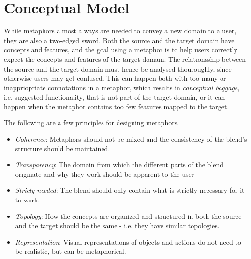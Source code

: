 \section{Conceptual Model} \label{sec:conceptual_model}






While metaphors almost always are needed to convey a new domain to a user, they are also a two-edged sword. Both the source and the target domain have concepts and features, and the goal using a metaphor is to help users correctly expect the concepts and features of the target domain. The relationsship between the source and the target domain must hence be analysed thouroughly, since otherwise users may get confused. This can happen both with too many or inappriopriate connotations in a metaphor, which results in \emph{conceptual baggage}, i.e. suggested functionality, that is not part of the target domain, or it can happen when the metaphor contains too few features mapped to the target. \cite[p. 192, 195-196]{benyon14} \cite[p. 181-182]{anderson} 



The following are a few principles for designing metaphors. \cite[p. 196]{benyon14}
\begin{itemize}
  \item \emph{Coherence}:
    Metaphors should not be mixed and the consistency of the blend's structure should be maintained.
  \item \emph{Transparency}:
    The domain from which the different parts of the blend originate and why they work should be apparent to the user
  \item \emph{Stricly needed}:
    The blend should only contain what is strictly necessary for it to work.
  \item \emph{Topology}:
    How the concepts are organized and structured in both the source and the target should be the same - i.e. they have similar topologies.
  \item \emph{Representation}:
    Visual representations of objects and actions do not need to be realistic, but can be metaphorical.    
\end{itemize}



\todo



